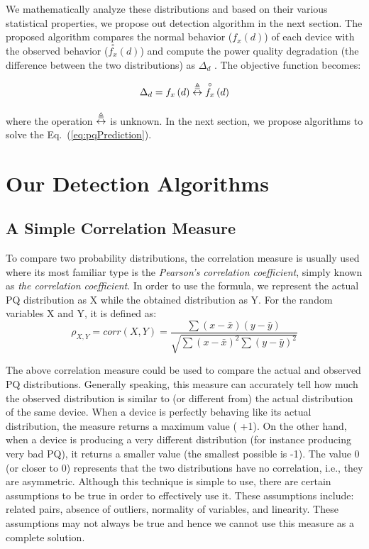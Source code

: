 We mathematically analyze these distributions and based on their various statistical properties, we propose out detection algorithm in the next section. The proposed algorithm compares the normal behavior ($f_x\left(d\right)$) of each device with the observed behavior ($\overset{\circ}{f_x}\left(d\right)$) and compute the power quality degradation (the difference between the two distributions) as $\Delta_d$ . The objective function becomes:

\begin{equation}
\label{eq:pqPrediction}
\Delta_d = f_x\left(d\right) \mathrel{\overset\triangleq\leftrightarrow} \overset{\circ}{f_x}\left(d\right)
\end{equation}

\noindent where the operation $\mathrel{\overset\triangleq\leftrightarrow}$ is unknown. In the next section,  we propose algorithms to solve the Eq.~(\ref{eq:pqPrediction}).

\section{Our Detection Algorithms}
\subsection{A Simple Correlation Measure}
To compare two probability distributions, the correlation measure is usually used where its most familiar type is the \textit{Pearson's correlation coefficient}, simply known as \textit{the correlation coefficient}. In order to use the formula, we represent the actual PQ distribution as X while the obtained distribution as Y. For the random variables X and Y, it is defined as:
\[\rho_{X,Y} = corr(X,Y) = \frac{\sum (x-\bar x) (y-\bar y)}{\sqrt{\sum (x-\bar x)^2 \sum (y-\bar y)^2}}\]

The above correlation measure could be used to compare the actual and observed PQ distributions. Generally speaking, this measure can accurately tell how much the observed distribution is similar to (or different from) the actual distribution of the same device. When a device is perfectly behaving like its actual distribution, the measure returns a maximum value (  +1). On the other hand, when a device is producing a very different distribution (for instance producing very bad PQ), it returns a smaller value (the smallest possible is -1). The value 0 (or closer to 0) represents that the two distributions have no correlation, i.e., they are asymmetric. Although this technique is simple to use, there are certain assumptions to be true in order to effectively use it. These assumptions include: related pairs, absence of outliers, normality of variables, and linearity. These assumptions may not always be true and hence we cannot use this measure as a complete solution.

